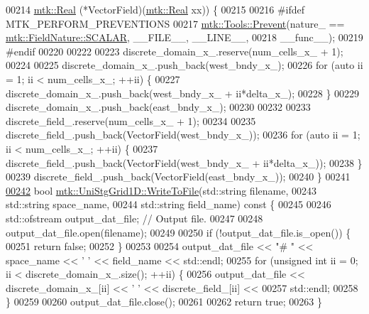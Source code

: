 \begin{DoxyCode}
00214     \hyperlink{group__c01-roots_gac080bbbf5cbb5502c9f00405f894857d}{mtk::Real} (*VectorField)(\hyperlink{group__c01-roots_gac080bbbf5cbb5502c9f00405f894857d}{mtk::Real} xx)) \{
00215 
00216 \textcolor{preprocessor}{  #ifdef MTK\_PERFORM\_PREVENTIONS}
00217   \hyperlink{classmtk_1_1Tools_a332324c6f25e66be9dff48c5987a3b9f}{mtk::Tools::Prevent}(nature\_ == \hyperlink{namespacemtk_ga4c54f2a329cfb4e56213b02a259d19e2a8f3d9a4b6a7b7f2c7afa61ca113d0db9}{mtk::FieldNature::SCALAR}, 
      \_\_FILE\_\_, \_\_LINE\_\_,
00218 \_\_func\_\_);
00219 \textcolor{preprocessor}{  #endif}
00220 
00222 
00223   discrete\_domain\_x\_.reserve(num\_cells\_x\_ + 1);
00224 
00225   discrete\_domain\_x\_.push\_back(west\_bndy\_x\_);
00226   \textcolor{keywordflow}{for} (\textcolor{keyword}{auto} ii = 1; ii < num\_cells\_x\_; ++ii) \{
00227     discrete\_domain\_x\_.push\_back(west\_bndy\_x\_ + ii*delta\_x\_);
00228   \}
00229   discrete\_domain\_x\_.push\_back(east\_bndy\_x\_);
00230 
00232 
00233   discrete\_field\_.reserve(num\_cells\_x\_ + 1);
00234 
00235   discrete\_field\_.push\_back(VectorField(west\_bndy\_x\_));
00236   \textcolor{keywordflow}{for} (\textcolor{keyword}{auto} ii = 1; ii < num\_cells\_x\_; ++ii) \{
00237     discrete\_field\_.push\_back(VectorField(west\_bndy\_x\_ + ii*delta\_x\_));
00238   \}
00239   discrete\_field\_.push\_back(VectorField(east\_bndy\_x\_));
00240 \}
00241 
\hypertarget{mtk__uni__stg__grid__1d_8cc_source_l00242}{}\hyperlink{classmtk_1_1UniStgGrid1D_a6d2c10aa9468a037829f0eb043b898dc}{00242} \textcolor{keywordtype}{bool} \hyperlink{classmtk_1_1UniStgGrid1D_a6d2c10aa9468a037829f0eb043b898dc}{mtk::UniStgGrid1D::WriteToFile}(std::string filename,
00243                                     std::string space\_name,
00244                                     std::string field\_name)\textcolor{keyword}{ const }\{
00245 
00246   std::ofstream output\_dat\_file;  \textcolor{comment}{// Output file.}
00247 
00248   output\_dat\_file.open(filename);
00249 
00250   \textcolor{keywordflow}{if} (!output\_dat\_file.is\_open()) \{
00251     \textcolor{keywordflow}{return} \textcolor{keyword}{false};
00252   \}
00253 
00254   output\_dat\_file << \textcolor{stringliteral}{"# "} << space\_name <<  \textcolor{charliteral}{' '} << field\_name << std::endl;
00255   \textcolor{keywordflow}{for} (\textcolor{keywordtype}{unsigned} \textcolor{keywordtype}{int} ii = 0; ii < discrete\_domain\_x\_.size(); ++ii) \{
00256     output\_dat\_file << discrete\_domain\_x\_[ii] << \textcolor{charliteral}{' '} << discrete\_field\_[ii] <<
00257       std::endl;
00258   \}
00259 
00260   output\_dat\_file.close();
00261 
00262   \textcolor{keywordflow}{return} \textcolor{keyword}{true};
00263 \}
\end{DoxyCode}
